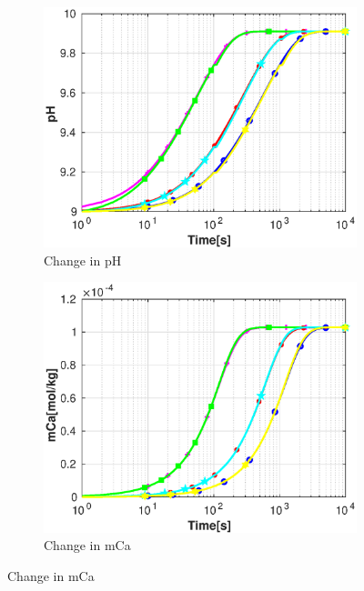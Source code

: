 \begin{figure}
   \centering
   \begin{subfigure}{.5\linewidth}
            \centering
        \includegraphics[width=\textwidth]{PICTURES/dvm_pH9_pH.eps}
        \caption{Change in pH}
        \label{fig:dvmpH9pH}
    \end{subfigure}%
        \hfill
    \begin{subfigure}{.5\linewidth}
            \centering
        \includegraphics[width=\textwidth]{PICTURES/dvm_pH9_mCa.eps}
        \caption{Change in mCa}
        \label{fig:dvmpH9mCa}
    \end{subfigure}%

\end{figure}
